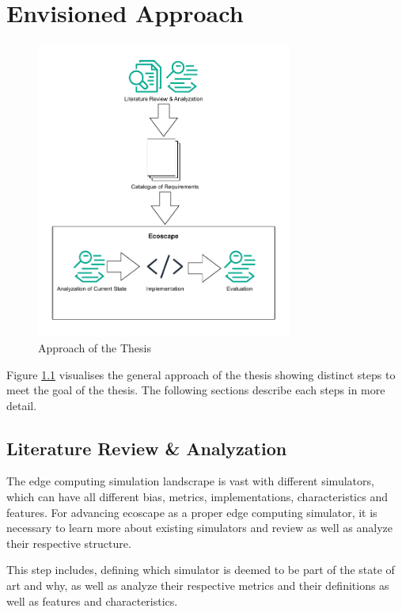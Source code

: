 \chapter{Envisioned Approach}
\begin{figure}
  \centering
  \includegraphics[width=0.75\textwidth]{img/approach_figure.pdf}
  \caption{Approach of the Thesis}
  \label{fig:approach_figure}
\end{figure}
Figure \ref{fig:approach_figure} visualises the general approach of the thesis showing distinct steps to meet the goal of the thesis.
The following sections describe each steps in more detail.

\section{Literature Review \& Analyzation}\label{approach:literature-review}
The edge computing simulation landscrape is vast with different simulators, which can have all different bias, metrics, implementations, characteristics and features.
For advancing ecoscape as a proper edge computing simulator, it is necessary to learn more about existing simulators and review as well as analyze their respective structure.

This step includes, defining which simulator is deemed to be part of the state of art and why, as well as analyze their respective metrics and their definitions as well as features and characteristics.

